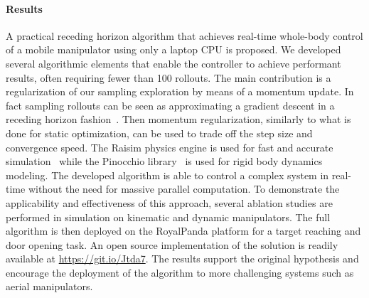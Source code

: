 \paragraph{Results} A practical receding horizon algorithm that achieves real-time whole-body control of a mobile manipulator using only a laptop CPU is proposed. We developed several algorithmic elements that enable the controller to achieve performant results, often requiring fewer than 100 rollouts. The main contribution is a regularization of our sampling exploration by means of a momentum update. In fact sampling rollouts can be seen as approximating a gradient descent in a receding horizon fashion~\cite{lambert_stein_2020}. Then momentum regularization, similarly to what is done for static optimization, can be used to trade off the step size and convergence speed. The Raisim physics engine is used for fast and accurate simulation~\cite{raisim} while the Pinocchio library~\cite{pinocchioweb} is used for rigid body dynamics modeling. The developed algorithm is able to control a complex system in real-time without the need for massive parallel computation. To demonstrate the applicability and effectiveness of this approach, several ablation studies are performed in simulation on kinematic and dynamic manipulators. The full algorithm is then deployed on the RoyalPanda platform for a target reaching and door opening task. An open source implementation of the solution is readily available at \url{https://git.io/Jtda7}. The results support the original hypothesis and encourage the deployment of the algorithm to more challenging systems such as aerial manipulators.

